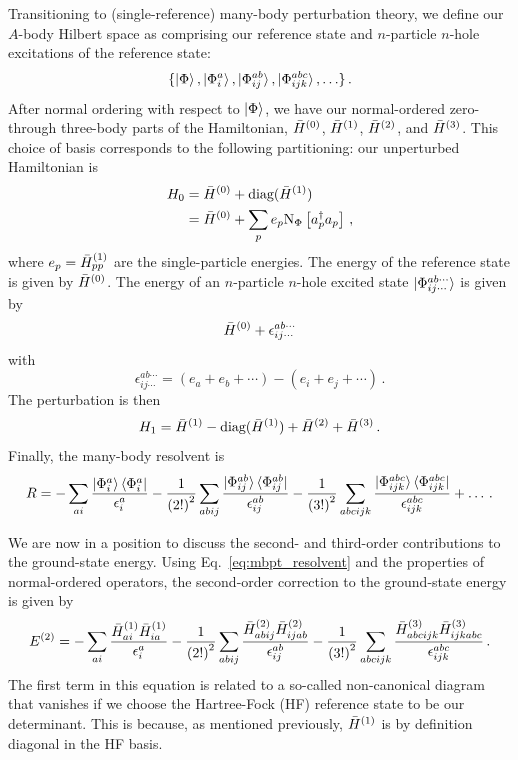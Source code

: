 Transitioning to (single-reference) many-body perturbation theory,
we define our $A$-body Hilbert space as comprising our reference state
and $n$-particle $n$-hole excitations of the reference state:
\begin{equation}
  \{\ket{\Phi}, \ket{\Phi_{i}^{a}}, \ket{\Phi_{ij}^{ab}}, \ket{\Phi_{ijk}^{abc}}, \ldots \}\,.
\end{equation}
After normal ordering with respect to $\ket{\Phi}$,
we have our normal-ordered zero- through three-body
parts of the Hamiltonian,
${\bar{H}}^{(0)}$, ${\bar{H}}^{(1)}$, ${\bar{H}}^{(2)}$, and ${\bar{H}}^{(3)}$.
This choice of basis corresponds to the following partitioning:
our unperturbed Hamiltonian is
\begin{align}
  H_0 & = {\bar{H}}^{(0)} + \text{diag}({\bar{H}}^{(1)})                       \\
      & = {\bar{H}}^{(0)} + \sum_{p} e_p \text{N}_{\Phi}\left[a_{p}^{\dagger} a_{p}\right]\,,
\end{align}
where $e_p = {\bar{H}}^{(1)}_{pp}$ are the single-particle energies.
The energy of the reference state is given by ${\bar{H}}^{(0)}$.
The energy of an $n$-particle $n$-hole excited state $\ket{\Phi_{ij\cdots}^{ab\cdots}}$ is given by
\begin{equation}
  {\bar{H}}^{(0)} + \epsilon_{ij\cdots}^{ab\cdots}
\end{equation}
with
\begin{equation}\label{eq:mp_energy_denom}
  \epsilon_{ij\cdots}^{ab\cdots} = (e_a + e_b + \cdots) - (e_i + e_j + \cdots)\,.
\end{equation}
The perturbation is then
\begin{equation}
  H_1 = {\bar{H}}^{(1)} - \text{diag}({\bar{H}}^{(1)}) + {\bar{H}}^{(2)} + {\bar{H}}^{(3)}\,.
\end{equation}
Finally, the many-body resolvent is
\begin{equation}\label{eq:mbpt_resolvent}
  R = -\sum_{ai} \frac{\ket{\Phi_{i}^{a}}\bra{\Phi_{i}^{a}}}{\epsilon_{i}^{a}}
  -\frac{1}{{(2!)}^2} \sum_{abij}\frac{\ket{\Phi_{ij}^{ab}}\bra{\Phi_{ij}^{ab}}}{\epsilon_{ij}^{ab}}
  -\frac{1}{{(3!)}^2} \sum_{abcijk}\frac{\ket{\Phi_{ijk}^{abc}}\bra{\Phi_{ijk}^{abc}}}{\epsilon_{ijk}^{abc}}
  + \ldots \,.
\end{equation}

We are now in a position to discuss the second- and third-order contributions to the ground-state energy.
Using Eq.~\eqref{eq:mbpt_resolvent} and the properties of normal-ordered operators,
the second-order correction to the ground-state energy is given by
\begin{equation}
  E^{(2)} = -\sum_{ai} \frac{{\bar{H}}^{(1)}_{ai}{\bar{H}}^{(1)}_{ia}}{\epsilon_{i}^{a}}
  -\frac{1}{{(2!)}^2} \sum_{abij}\frac{{\bar{H}}^{(2)}_{abij}{\bar{H}}^{(2)}_{ijab}}{\epsilon_{ij}^{ab}}
  -\frac{1}{{(3!)}^2} \sum_{abcijk}\frac{{\bar{H}}^{(3)}_{abcijk}{\bar{H}}^{(3)}_{ijkabc}}{\epsilon_{ijk}^{abc}}\,.
\end{equation}
The first term in this equation is related to a so-called non-canonical diagram
that vanishes if we choose the Hartree-Fock (HF) reference state to be our determinant.
This is because, as mentioned previously, ${\bar{H}}^{(1)}$ is by definition diagonal in the HF basis.

